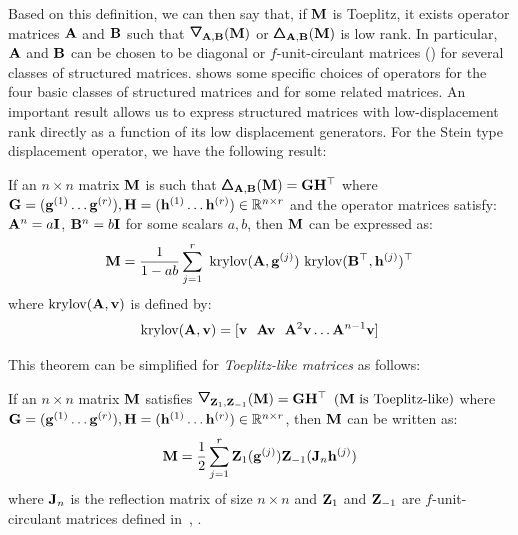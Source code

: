\noindent
Based on this definition, we can then say that, if $\mathbf{M}$ is Toeplitz, it exists operator matrices $\mathbf{A}$ and $\mathbf{B}$ such that $\triangleopdown_{\Amat, \Bmat} (\Mmat)$ or $\pmb{\bigtriangleup}_{\mathbf{A}, \mathbf{B}} (\mathbf{M})$ is low rank.
In particular, $\mathbf{A}$ and $\mathbf{B}$ can be chosen to be diagonal or $f$-unit-circulant matrices (\eg {}) for several classes of structured matrices.
 shows some specific choices of operators for the four basic classes of structured matrices and for some related matrices.
An important result allows us to express structured matrices with low-displacement rank directly as a function of its low displacement generators.  
For the Stein type displacement operator, we have the following result:
\begin{theorem}
  If an $n \times n$ matrix $\mathbf{M}$ is such that $\pmb{\bigtriangleup}_{\mathbf{A}, \mathbf{B}}(\mathbf{M}) = \mathbf{G} \mathbf{H}^\top$ where 
  $\mathbf{G} = (\mathbf{g}^{(1)} \ldots \mathbf{g}^{(r)}), \mathbf{H} = (\mathbf{h}^{(1)} \ldots \mathbf{h}^{(r)}) \in \mathbb{R}^{n \times r}$ 
  and the operator matrices satisfy: $\mathbf{A}^n = a \mathbf{I}$, $\mathbf{B}^n = b \mathbf{I}$ for some scalars $a, b$, then $\mathbf{M}$ can be expressed as: 
  \begin{equation}
    \mathbf{M} = \frac{1}{1 - ab} \sum_{j=1}^{r} ~\mathrm{krylov}(\mathbf{A}, \mathbf{g}^{(j)}) ~\mathrm{krylov}(\mathbf{B}^\top, \mathbf{h}^{(j)})^\top
    \label{equation:ch3-krylov_decomposition}
  \end{equation}
  where $\mathrm{krylov}(\mathbf{A}, \mathbf{v})$ is defined by:
  \begin{equation}
    \mathrm{krylov}(\mathbf{A}, \mathbf{v}) = [\mathbf{v}~~\mathbf{A}\mathbf{v}~~\mathbf{A}^2 \mathbf{v} \ldots \mathbf{A}^{n-1} \mathbf{v}]
  \end{equation}
  \label{theorem:ch3-krylov_decomposition}
  \removespace
\end{theorem} 
\noindent
This theorem can be simplified for \emph{Toeplitz-like matrices} as follows:
\begin{theorem}
  If an $n \times n$ matrix $\mathbf{M}$ satisfies $\triangleopdown_{\Zmat_1, \Zmat_{-1}}(\Mmat) = \Gmat \Hmat^\top$ $(\mathbf{M} \text{ is Toeplitz-like})$ where $\mathbf{G} = (\mathbf{g} ^{(1)} \ldots \mathbf{g}^{(r)}), \mathbf{H} = (\mathbf{h}^{(1)} \ldots \mathbf{h}^{(r)}) \in \mathbb{R}^{n \times r}$, then $\mathbf{M}$ can be written as: 
  \begin{equation} 
    \mathbf{M} = \frac{1}{2} \sum_{j=1}^{r} \mathbf{Z}_1(\mathbf{g}^{(j)}) \mathbf{Z}_{-1}(\mathbf{J}_n \mathbf{h}^{(j)})
    \label{equation:ch3-toeplitz_like_matrix_decomposition}
  \end{equation}
  where $\mathbf{J}_n$ is the reflection matrix of size $n \times n$ and $\mathbf{Z}_1$ and $\mathbf{Z}_{-1}$ are $f$-unit-circulant matrices defined in~, .
\end{theorem}

